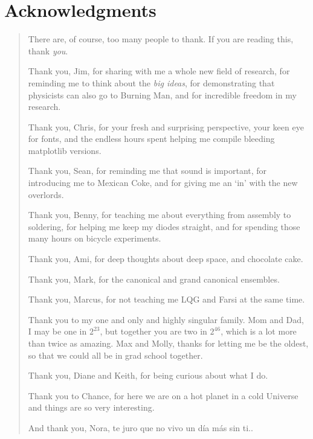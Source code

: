 \ifx\master\undefined\fi

\prelimheaders

\chapter*{Acknowledgments}

\begin{quote}
\centering
There are, of course, too many people to thank. If you are reading this, thank \emph{you}.

Thank you, Jim, for sharing with me a whole new field of research, for reminding me to think about the \emph{big ideas}, for demonstrating that physicists can also go to Burning Man, and for incredible freedom in my research.

Thank you, Chris, for your fresh and surprising perspective, your keen eye for fonts, and the endless hours spent helping me compile bleeding matplotlib versions.

Thank you, Sean, for reminding me that sound is important, for introducing me to Mexican Coke, and for giving me an `in' with the new overlords.

Thank you, Benny, for teaching me about everything from assembly to soldering, for helping me keep my diodes straight, and for spending those many hours on bicycle experiments.

Thank you, Ami, for deep thoughts about deep space, and chocolate cake.

Thank you, Mark, for the canonical and grand canonical ensembles.

Thank you, Marcus, for not teaching me LQG and Farsi at the same time.

Thank you to my one and only and highly singular family. Mom and Dad, I may be one in $2^{23}$, but together you are two in $2^{46}$, which is a lot more than twice as amazing. Max and Molly, thanks for letting me be the oldest, so that we could all be in grad school together.

Thank you, Diane and Keith, for being curious about what I do.

Thank you to Chance, for here we are on a hot planet in a cold Universe and things are so very interesting.

And thank you, Nora, te juro que no vivo un d\'{i}a m\'{a}s sin ti..
\end{quote}


\ifx\master\undefined\fi
